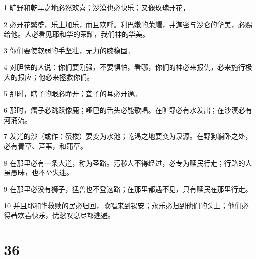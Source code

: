 \par 1 旷野和乾旱之地必然欢喜；沙漠也必快乐；又像玫瑰开花，
\par 2 必开花繁盛，乐上加乐，而且欢呼。利巴嫩的荣耀，并迦密与沙仑的华美，必赐给他。人必看见耶和华的荣耀，我们神的华美。
\par 3 你们要使软弱的手坚壮，无力的膝稳固。
\par 4 对胆怯的人说：你们要刚强，不要惧怕。看哪，你们的神必来报仇，必来施行极大的报应；他必来拯救你们。
\par 5 那时，瞎子的眼必睁开；聋子的耳必开通。
\par 6 那时，瘸子必跳跃像鹿；哑巴的舌头必能歌唱。在旷野必有水发出；在沙漠必有河涌流。
\par 7 发光的沙（或作：蜃楼）要变为水池；乾渴之地要变为泉源。在野狗躺卧之处，必有青草、芦苇，和蒲草。
\par 8 在那里必有一条大道，称为圣路。污秽人不得经过，必专为赎民行走；行路的人虽愚昧，也不至失迷。
\par 9 在那里必没有狮子，猛兽也不登这路；在那里都遇不见，只有赎民在那里行走。
\par 10 并且耶和华救赎的民必归回，歌唱来到锡安；永乐必归到他们的头上；他们必得著欢喜快乐，忧愁叹息尽都逃避。

\chapter{36}

